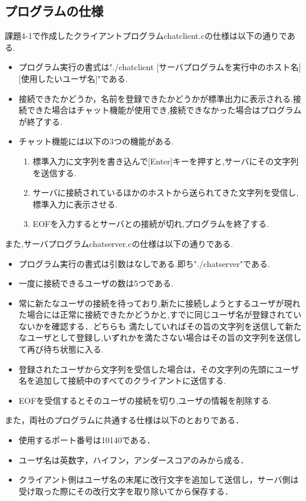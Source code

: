 \documentclass[dvipdfmx]{jarticle}
\begin{document}
\subsection{プログラムの仕様}
課題4-1で作成したクライアントプログラムchatclient.cの仕様は以下の通りである.
\begin{itemize}
    \item プログラム実行の書式は"./chatclient [サーバプログラムを実行中のホスト名] [使用したいユーザ名]"である.
    \item 接続できたかどうか，名前を登録できたかどうかが標準出力に表示される.接続できた場合はチャット機能が使用でき,接続できなかった場合はプログラムが終了する.
    \item チャット機能には以下の3つの機能がある.
    \begin{enumerate}
        \item 標準入力に文字列を書き込んで[Enter]キーを押すと,サーバにその文字列を送信する.
        \item サーバに接続されているほかのホストから送られてきた文字列を受信し,標準入力に表示させる.
        \item EOFを入力するとサーバとの接続が切れ,プログラムを終了する.
    \end{enumerate}
\end{itemize}
また,サーバプログラムchatserver.cの仕様は以下の通りである.
\begin{itemize}
    \item プログラム実行の書式は引数はなしである.即ち"./chatserver"である.
    \item 一度に接続できるユーザの数は5つである.
    \item 常に新たなユーザの接続を待っており,新たに接続しようとするユーザが現れた場合には正常に接続できたかどうかと,すでに同じユーザ名が登録されていないかを確認する．どちらも
    満たしていればその旨の文字列を送信して新たなユーザとして登録し,いずれかを満たさない場合はその旨の文字列を送信して再び待ち状態に入る.
    \item 登録されたユーザから文字列を受信した場合は，その文字列の先頭にユーザ名を追加して接続中のすべてのクライアントに送信する.
    \item EOFを受信するとそのユーザの接続を切り,ユーザの情報を削除する.
\end{itemize}
また，両社のプログラムに共通する仕様は以下のとおりである．
\begin{itemize}
    \item 使用するポート番号は10140である．
    \item ユーザ名は英数字，ハイフン，アンダースコアのみから成る．
    \item クライアント側はユーザ名の末尾に改行文字を追加して送信し，サーバ側は受け取った際にその改行文字を取り除いてから保存する．
\end{itemize}
\end{document}
